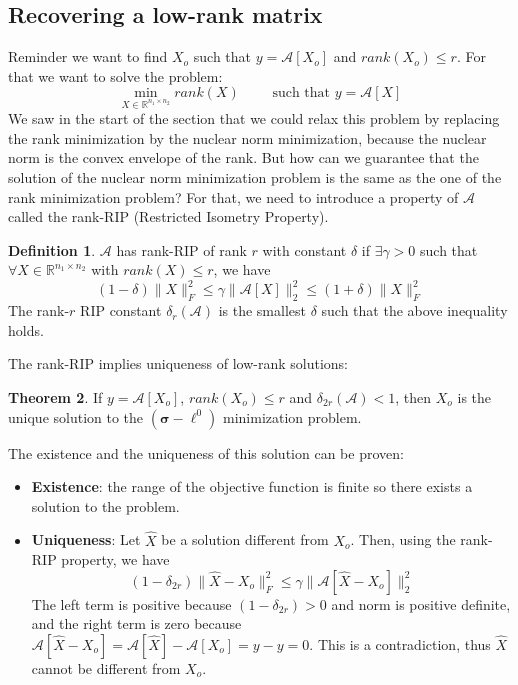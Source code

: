 \documentclass[12pt, openany]{report}
\newcommand{\R}{\mathbb{R}}
\theoremstyle{definition}
\newtheorem{thm}{Theorem}[chapter]
\newtheorem{definition}[thm]{Definition}
\begin{document}
\subsection{Recovering a low-rank matrix}
Reminder we want to find $X_o$ such that $y = \mathcal{A}[X_o]$ and $rank(X_o) \leq r$. For that we want to solve the problem:
\begin{equation}
	\min_{X\in \R^{n_1\times n_2}} rank(X) \qquad \text{ such that } y = \mathcal{A}[X]
\end{equation}
We saw in the start of the section that we could relax this problem by replacing the rank minimization by the nuclear norm minimization, because the nuclear norm is the convex envelope of the rank. But how can we guarantee that the solution of the nuclear norm minimization problem is the same as the one of the rank minimization problem? For that, we need to introduce a property of $\mathcal{A}$ called the rank-RIP (Restricted Isometry Property).
\begin{definition}
	$\mathcal{A}$ has rank-RIP of rank $r$ with constant $\delta$ if $\exists \gamma > 0 $ such that $\forall X\in \R^{n_1\times n_2}$ with $rank(X) \leq r$, we have
	\begin{equation}
		(1-\delta)\|X\|_F^2 \leq \gamma\|\mathcal{A}[X]\|_2^2 \leq (1+\delta)\|X\|_F^2
	\end{equation}
	The rank-$r$ RIP constant $\delta_r(\mathcal{A})$ is the smallest $\delta$ such that the above inequality holds.
\end{definition}
The rank-RIP implies uniqueness of low-rank solutions:
\begin{thm}
	If $y = \mathcal{A}[X_o]$, $rank(X_o) \leq r$ and $\delta_{2r}(\mathcal{A}) < 1$, then $X_o$ is the unique solution to the $(\boldsymbol{\sigma}-\ell^0)$ minimization problem.
\end{thm}
The existence and the uniqueness of this solution can be proven:
\begin{itemize}
	\item \textbf{Existence}: the range of the objective function is finite so there exists a solution to the problem.
	\item \textbf{Uniqueness}: Let $\hat{X}$ be a solution different from $X_o$. Then, using the rank-RIP property, we have
	\begin{equation}
		(1-\delta_{2r}) \|\hat{X}-X_o\|_F^2 \leq \gamma \|\mathcal{A}[\hat{X}-X_o]\|_2^2
	\end{equation}
	The left term is positive because $(1-\delta_{2r}) > 0$ and norm is positive definite, and the right term is zero because $\mathcal{A}[\hat{X}-X_o] = \mathcal{A}[\hat{X}] - \mathcal{A}[X_o] = y-y=0$. This is a contradiction, thus $\hat{X}$ cannot be different from $X_o$.  
\end{itemize}
\end{document}
